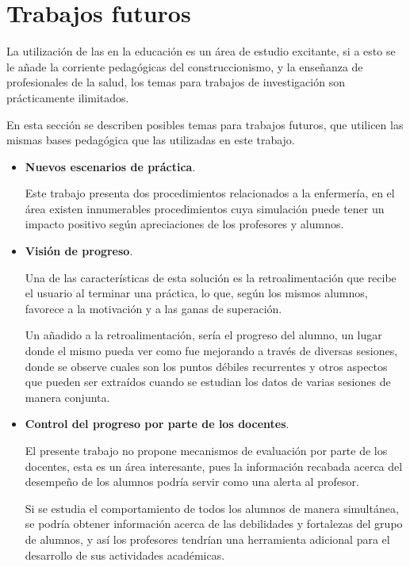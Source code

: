 \section{Trabajos futuros}

La utilización de las  en la educación es un área de estudio excitante, si a
esto se le añade la corriente pedagógicas del construccionismo, y la enseñanza
de profesionales de la salud, los temas para trabajos de investigación son
prácticamente ilimitados. 

En esta sección se describen posibles temas para trabajos futuros, que utilicen
las mismas bases pedagógica que las utilizadas en este trabajo.

\begin{itemize} 
   
\item \textbf{Nuevos escenarios de práctica}.

Este trabajo presenta dos procedimientos relacionados a la enfermería, en el
área existen innumerables procedimientos cuya simulación puede tener un impacto
positivo según apreciaciones de los profesores y alumnos.

\item \textbf{Visión de progreso}.

Una de las características de esta solución es la retroalimentación que recibe
el usuario al terminar una práctica, lo que, según los mismos alumnos, favorece
a la motivación y a las ganas de superación.

Un añadido a la retroalimentación, sería el progreso del alumno, un lugar donde
el mismo pueda ver como fue mejorando a través de diversas sesiones, donde se
observe cuales son los puntos débiles recurrentes y otros aspectos que pueden
ser extraídos cuando se estudian los datos de varias sesiones de manera
conjunta. 

\item \textbf{Control del progreso por parte de los docentes}.

El presente trabajo no propone mecanismos de evaluación por parte de los
docentes, esta es un área interesante, pues la información recabada acerca del
desempeño de los alumnos podría servir como una alerta al profesor.

Si se estudia el comportamiento de todos los alumnos de manera simultánea, se
podría obtener información acerca de las debilidades y fortalezas del grupo de
alumnos, y así los profesores tendrían una herramienta adicional para el
desarrollo de sus actividades académicas.


\end{itemize}
